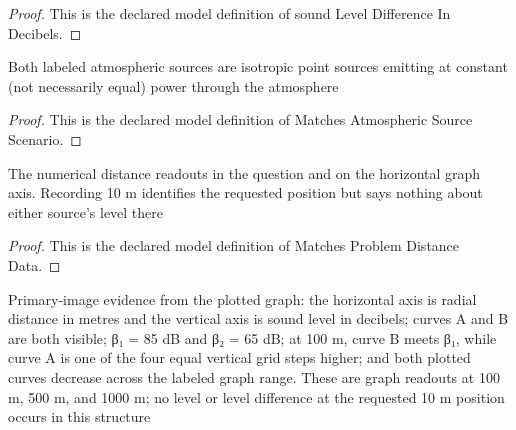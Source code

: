 \begin{proof}
  This is the declared model definition of sound Level Difference In Decibels.
\end{proof}
\begin{definition}
  \label{def:physics:phyx-mini-0317:phyxminiproblems-problemphyxmini0317-matchesatmosphericsourcescenario}
  Both labeled atmospheric sources are isotropic point sources emitting at constant (not necessarily equal) power through the atmosphere
\end{definition}
\begin{proof}
  This is the declared model definition of Matches Atmospheric Source Scenario.
\end{proof}
\begin{definition}
  \label{def:physics:phyx-mini-0317:phyxminiproblems-problemphyxmini0317-matchesproblemdistancedata}
  The numerical distance readouts in the question and on the horizontal graph axis. Recording 10 m identifies the requested position but says nothing about either source's level there
\end{definition}
\begin{proof}
  This is the declared model definition of Matches Problem Distance Data.
\end{proof}
\begin{definition}
  \label{def:physics:phyx-mini-0317:phyxminiproblems-problemphyxmini0317-matchessuppliedsoundlevelgraph}
  Primary-image evidence from the plotted graph: the horizontal axis is radial distance in metres and the vertical axis is sound level in decibels; curves A and B are both visible; β₁ = 85 dB and β₂ = 65 dB; at 100 m, curve B meets β₁, while curve A is one of the four equal vertical grid steps higher; and both plotted curves decrease across the labeled graph range. These are graph readouts at 100 m, 500 m, and 1000 m; no level or level difference at the requested 10 m position occurs in this structure
\end{definition}
